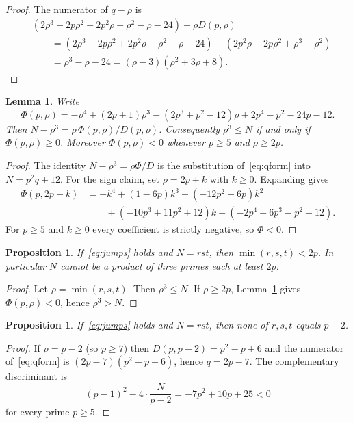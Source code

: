 \documentclass[11pt,reqno]{amsart}
\newtheorem{lemma}[theorem]{Lemma}
\newtheorem{proposition}[theorem]{Proposition}
\theoremstyle{definition}
\begin{document}
\begin{proof}
The numerator of \(q-\rho\) is
\begin{align*}
&(2\rho^3-2p\rho^2+2p^2\rho-\rho^2-\rho-24)-\rho D(p,\rho)\\
&\qquad=(2\rho^3-2p\rho^2+2p^2\rho-\rho^2-\rho-24)-(2p^2\rho-2p\rho^2+\rho^3-\rho^2)\\
&\qquad=\rho^3-\rho-24=(\rho-3)(\rho^2+3\rho+8).
\end{align*}
\end{proof}

\begin{lemma}
\label{lem:Phi}
Write
\[
\Phi(p,\rho)=-\rho^4+(2p+1)\rho^3-(2p^3+p^2-12)\rho+2p^4-p^2-24p-12.
\]
Then \(N-\rho^3=\rho\,\Phi(p,\rho)/D(p,\rho)\). Consequently \(\rho^3\le N\) if and only if \(\Phi(p,\rho)\ge 0\). Moreover \(\Phi(p,\rho)<0\) whenever \(p\ge 5\) and \(\rho\ge 2p\).
\end{lemma}

\begin{proof}
The identity \(N-\rho^3=\rho\Phi/D\) is the substitution of~\eqref{eq:qform} into \(N=p^2q+12\). For the sign claim, set \(\rho=2p+k\) with \(k\ge 0\). Expanding gives
\begin{align*}
\Phi(p,2p+k)
&=-k^4+(1-6p)k^3+(-12p^2+6p)k^2\\
&\qquad+(-10p^3+11p^2+12)k+(-2p^4+6p^3-p^2-12).
\end{align*}
For \(p\ge 5\) and \(k\ge 0\) every coefficient is strictly negative, so \(\Phi<0\).
\end{proof}

\begin{proposition}
\label{prop:balanced}
If~\eqref{eq:jumps} holds and \(N=rst\), then \(\min(r,s,t)<2p\). In particular \(N\) cannot be a product of three primes each at least \(2p\).
\end{proposition}

\begin{proof}
Let \(\rho=\min(r,s,t)\). Then \(\rho^3\le N\). If \(\rho\ge 2p\), Lemma~\ref{lem:Phi} gives \(\Phi(p,\rho)<0\), hence \(\rho^3>N\).
\end{proof}

\begin{proposition}
\label{prop:pm2}
If~\eqref{eq:jumps} holds and \(N=rst\), then none of \(r,s,t\) equals \(p-2\).
\end{proposition}

\begin{proof}
If \(\rho=p-2\) (so \(p\ge 7\)) then \(D(p,p-2)=p^2-p+6\) and the numerator of~\eqref{eq:qform} is \((2p-7)(p^2-p+6)\), hence \(q=2p-7\). The complementary discriminant is
\[
(p-1)^2-4\cdot\frac{N}{p-2}=-7p^2+10p+25<0
\]
for every prime \(p\ge 5\).
\end{proof}
\end{document}

